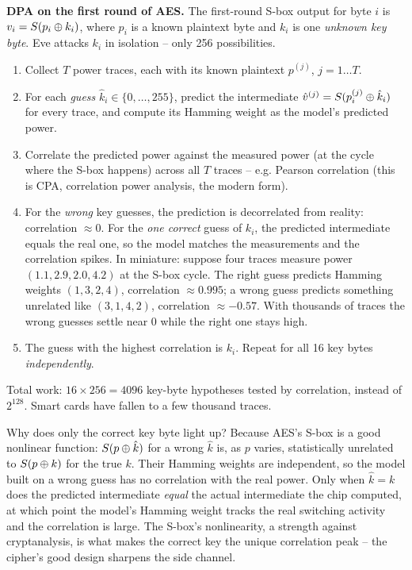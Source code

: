 \begin{attackbox}
\textbf{DPA on the first round of AES.} The first-round S-box output for byte $i$ is $v_i = S(p_i \oplus k_i)$, where $p_i$ is a known plaintext byte and $k_i$ is one \emph{unknown key byte}. Eve attacks $k_i$ in isolation -- only 256 possibilities.
\begin{enumerate}
\item Collect $T$ power traces, each with its known plaintext $p^{(j)}$, $j = 1 \ldots T$.
\item For each \emph{guess} $\hat{k}_i \in \{0,\ldots,255\}$, predict the intermediate $\hat{v}^{(j)} = S(p_i^{(j)} \oplus \hat{k}_i)$ for every trace, and compute its Hamming weight as the model's predicted power.
\item Correlate the predicted power against the measured power (at the cycle where the S-box happens) across all $T$ traces -- e.g. Pearson correlation (this is CPA, correlation power analysis, the modern form).
\item For the \emph{wrong} key guesses, the prediction is decorrelated from reality: correlation $\approx 0$. For the \emph{one correct} guess of $k_i$, the predicted intermediate equals the real one, so the model matches the measurements and the correlation spikes. In miniature: suppose four traces measure power $(1.1, 2.9, 2.0, 4.2)$ at the S-box cycle. The right guess predicts Hamming weights $(1, 3, 2, 4)$, correlation $\approx 0.995$; a wrong guess predicts something unrelated like $(3, 1, 4, 2)$, correlation $\approx -0.57$. With thousands of traces the wrong guesses settle near $0$ while the right one stays high.
\item The guess with the highest correlation is $k_i$. Repeat for all 16 key bytes \emph{independently}.
\end{enumerate}
Total work: $16 \times 256 = 4096$ key-byte hypotheses tested by correlation, instead of $2^{128}$. Smart cards have fallen to a few thousand traces.
\end{attackbox}


\begin{whybox}
Why does only the correct key byte light up? Because AES's S-box is a good nonlinear function: $S(p \oplus \hat{k})$ for a wrong $\hat{k}$ is, as $p$ varies, statistically unrelated to $S(p \oplus k)$ for the true $k$. Their Hamming weights are independent, so the model built on a wrong guess has no correlation with the real power. Only when $\hat{k} = k$ does the predicted intermediate \emph{equal} the actual intermediate the chip computed, at which point the model's Hamming weight tracks the real switching activity and the correlation is large. The S-box's nonlinearity, a strength against cryptanalysis, is what makes the correct key the unique correlation peak -- the cipher's good design sharpens the side channel.
\end{whybox}

